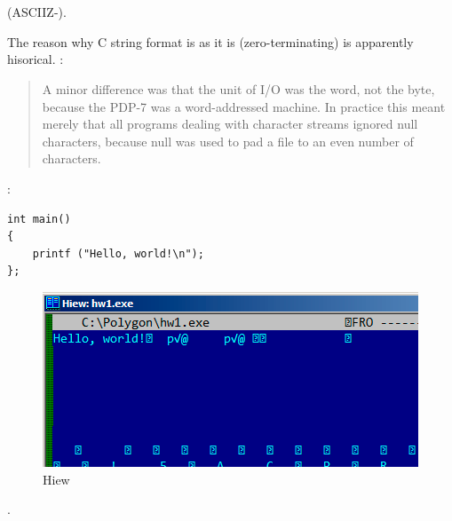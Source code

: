 \section{}

\label{C_strings}
(\ac{ASCIIZ}-).

{The reason why C string format is as it is (zero-terminating) is apparently hisorical}.
 \cite{Ritchie79} :

\begin{framed}
\begin{quotation}
A minor difference was that the unit of I/O was the word, not the byte, because the PDP-7 was a word-addressed
machine. In practice this meant merely that all programs dealing with character streams ignored null
characters, because null was used to pad a file to an even number of characters.
\end{quotation}
\end{framed}

:

\begin{lstlisting}
int main()
{
	printf ("Hello, world!\n");
};
\end{lstlisting}

\begin{figure}[H]
\centering
\includegraphics[scale=0.66]{digging_into_code/strings/C-string.png}
\caption{Hiew}
\end{figure}

.

